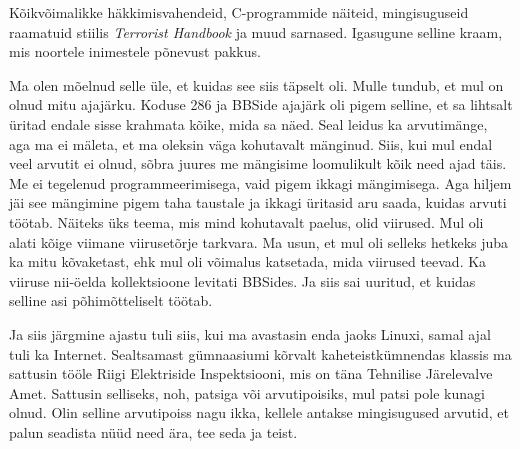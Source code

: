 
Kõikvõimalikke häkkimisvahendeid, C-programmide näiteid, mingisuguseid raamatuid 
stiilis \emph{Terrorist Handbook} ja muud sarnased. Igasugune 
selline kraam, mis  noortele inimestele põnevust pakkus.


Ma olen mõelnud selle üle, et kuidas see siis täpselt oli. Mulle tundub, et mul 
on olnud  mitu  ajajärku. Koduse 286 ja BBSide ajajärk oli pigem selline, et sa 
lihtsalt üritad endale sisse krahmata kõike, mida sa näed. Seal leidus ka 
arvutimänge, aga ma ei mäleta, et ma oleksin väga  kohutavalt mänginud. Siis, 
kui mul endal veel arvutit ei olnud,  sõbra juures me mängisime loomulikult 
kõik need ajad täis. Me ei tegelenud programmeerimisega, vaid pigem ikkagi 
mängimisega. Aga hiljem jäi see mängimine pigem taha taustale ja ikkagi 
üritasid aru saada, kuidas arvuti töötab. Näiteks üks teema, mis mind 
kohutavalt paelus, olid viirused. Mul oli alati kõige viimane viirusetõrje 
tarkvara. Ma usun, et mul oli selleks hetkeks juba ka mitu kõvaketast, ehk mul 
oli võimalus katsetada, mida viirused teevad. Ka  viiruse nii-öelda 
kollektsioone levitati BBSides. Ja siis sai uuritud, et kuidas selline asi 
põhimõtteliselt töötab. 

Ja siis järgmine ajastu tuli siis, kui ma avastasin enda jaoks 
Linuxi, samal ajal tuli ka Internet. Sealtsamast gümnaasiumi 
kõrvalt kaheteistkümnendas klassis ma sattusin tööle Riigi Elektriside 
Inspektsiooni, mis on täna Tehnilise Järelevalve Amet. Sattusin selliseks, noh,  patsiga või arvutipoisiks, mul patsi pole 
kunagi olnud. Olin selline arvutipoiss nagu ikka, kellele antakse mingisugused 
arvutid, et palun seadista nüüd need ära, tee seda ja teist.

